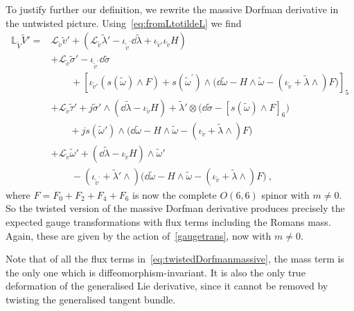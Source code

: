 \documentclass[debug]{phd}
\begin{document}
						To justify further our definition, we rewrite the massive Dorfman derivative in the untwisted picture.
						Using~\eqref{eq:fromLtotildeL} we find 
								\begin{equation}\label{eq:twistedDorfmanmassive}
									\begin{split}
										\mathbb{L}_{\tilde V} {\tilde V'} = & \mathcal{L}_{\tilde v} \tilde v' + (\mathcal{L}_{\tilde v}\tilde \lambda' - \iota_{\tilde v^\prime} \dd\tilde \lambda + \iota_{\tilde v'} \iota_{\tilde v} H ) \\
																& + \mathcal{L}_{\tilde v} \tilde \sigma' - \iota_{\tilde v^\prime}\dd\tilde \sigma \\
																 & \phantom{\mathcal{L}_{\tilde v} \tilde \sigma'} + \left[ \iota_{\tilde v'}(s(\tilde\omega) \wedge F)+ s(\tilde\omega^\prime) \wedge \big(\dd \tilde\omega - H\wedge \tilde\omega - (\iota_{\tilde v}+ \tilde \lambda \wedge)F\big) \right]_5 \\
																& + \mathcal{L}_{\tilde v} \tilde\tau' + j \tilde\sigma' \wedge (\dd \tilde\lambda - \iota_{\tilde v}H) + \tilde\lambda' \otimes \big( \dd \tilde\sigma - [s(\tilde \omega)\wedge F]_6 \big) \\
																&\phantom{\mathcal{L}_{\tilde v} \tilde\tau'} + j s(\tilde\omega') \wedge \big( \dd \tilde \omega - H\wedge\tilde \omega - (\iota_{\tilde v} + \tilde \lambda\wedge)F \big) \\ 
																& + \mathcal{L}_{\tilde v}\tilde\omega' + (\dd\tilde \lambda - \iota_{\tilde v} H) \wedge\tilde\omega' \\
																& \phantom{\mathcal{L}_{\tilde v}\tilde\omega'} - (\iota_{\tilde v^\prime}+ \tilde \lambda' \wedge) \big(\dd\tilde \omega - H \wedge\tilde \omega -(\iota_{\tilde v} +\tilde\lambda\wedge)F \big)\ ,
									\end{split}
								\end{equation}
						where $F = F_0+F_2 +F_4+F_6$ is now the complete $O(6,6)$ spinor with $m\neq 0$. 
						So the twisted version of the massive Dorfman derivative produces precisely the expected gauge transformations with flux terms including the Romans mass. 
						Again, these are given by the action of~\eqref{gaugetrans}, now with $m\neq 0$. 

						Note that of all the flux terms in~\eqref{eq:twistedDorfmanmassive}, the mass term is the only one which is diffeomorphism-invariant. 
						It is also the only true deformation of the generalised Lie derivative, since it cannot be removed by twisting the generalised tangent bundle.
\end{document}
